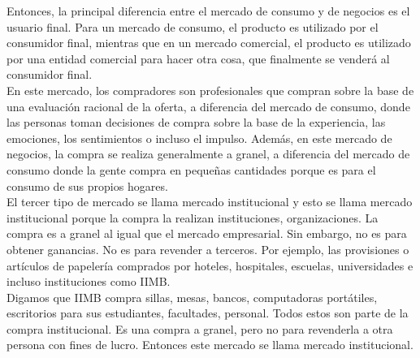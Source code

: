 \documentclass[10pt]{book}
\begin{document}
Entonces, la principal diferencia entre el mercado de consumo y de negocios es el usuario final. Para un mercado de consumo, el producto es utilizado por el consumidor final, mientras que en un mercado comercial, el producto es utilizado por una entidad comercial para hacer otra cosa, que finalmente se venderá al consumidor final.\\
En este mercado, los compradores son profesionales que compran sobre la base de una evaluación racional de la oferta, a diferencia del mercado de consumo, donde las personas toman decisiones de compra sobre la base de la experiencia, las emociones, los sentimientos o incluso el impulso. Además, en este mercado de negocios, la compra se realiza generalmente a granel, a diferencia del mercado de consumo donde la gente compra en pequeñas cantidades porque es para el consumo de sus propios hogares.\\
El tercer tipo de mercado se llama mercado institucional y esto se llama mercado institucional porque la compra la realizan instituciones, organizaciones. La compra es a granel al igual que el mercado empresarial. Sin embargo, no es para obtener ganancias. No es para revender a terceros. Por ejemplo, las provisiones o artículos de papelería comprados por hoteles, hospitales, escuelas, universidades e incluso instituciones como IIMB.\\
Digamos que IIMB compra sillas, mesas, bancos, computadoras portátiles, escritorios para sus estudiantes, facultades, personal. Todos estos son parte de la compra institucional. Es una compra a granel, pero no para revenderla a otra persona con fines de lucro. Entonces este mercado se llama mercado institucional.
\end{document}
